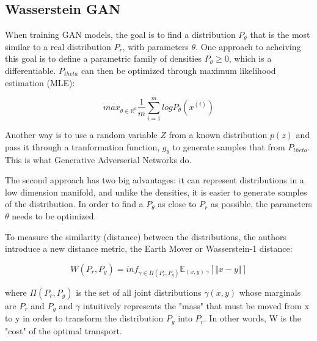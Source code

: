 
\subsection{Wasserstein GAN}

When training GAN models, the goal is to find a distribution $P_{\theta}$ that is the most similar to a real distribution $P_{r}$, with parameters $\theta$. One approach to acheiving this goal is to define a parametric family of densities $P_{\theta} \geq 0$, which is a differentiable. $P_{theta}$ can then be optimized through maximum likelihood estimation (MLE):

\begin{equation}
	\label{eq:mle}
	max_{\theta\in \mathbb{R}^{d}} \frac{1}{m} \sum_{i=1}^{m} log P_{\theta}(x^{(i)})
\end{equation}

Another way is to use a random variable $Z$ from a known distribution $p(z)$ and pass it through a tranformation function, $g_{\theta}$ to generate samples that from $P_{theta}$. This is what Generative Adverserial Networks do.

The second approach has two big advantages: it can represent distributions in a low dimension manifold, and unlike the densities, it is easier to generate samples of the distribution. In order to find a $P_{\theta}$ as close to $P_{r}$ as possible, the parameters $\theta$ needs to be optimized. 

To measure the similarity (distance) between the distributions, the authors introduce a new distance metric, the Earth Mover or Wasserstein-1 distance:

\begin{equation}
	\label{eq:em}
	W(P_{r}, P_{g}) = inf_{\gamma \in \Pi(P_{r},P_{g})} \mathbb{E}_{(x,y)~\gamma}[\Vert x - y \Vert]
\end{equation}

where $\Pi(P_{r}, P_{g})$ is the set of all joint distributions $\gamma(x,y)$ whose marginals are $P_{r}$ and $P_{g}$ and $\gamma$ intuitively represents the "mass" that must be moved from x to y in order to transform the distribution  $P_{g}$ into $P_{r}$. In other words, W is the "cost" of the optimal transport.

